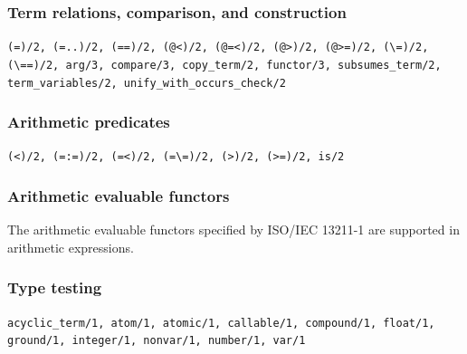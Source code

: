 \vspace{-4mm}
\subsubsection*{Term relations, comparison, and construction}\vspace{-2mm}
{\raggedright \texttt{(\allowbreak{}=)/\allowbreak{}2,\allowbreak{} (\allowbreak{}=..)/\allowbreak{}2,\allowbreak{} (\allowbreak{}==)/\allowbreak{}2,\allowbreak{} (\allowbreak{}@<)/\allowbreak{}2,\allowbreak{} (\allowbreak{}@=<)/\allowbreak{}2,\allowbreak{} (\allowbreak{}@>)/\allowbreak{}2,\allowbreak{} (\allowbreak{}@>=)/\allowbreak{}2,\allowbreak{} (\allowbreak{}\textbackslash=)/\allowbreak{}2,\allowbreak{} (\allowbreak{}\textbackslash==)/\allowbreak{}2,\allowbreak{} arg/\allowbreak{}3,\allowbreak{} compare/\allowbreak{}3,\allowbreak{} copy\_\allowbreak{}term/\allowbreak{}2,\allowbreak{} functor/\allowbreak{}3,\allowbreak{} subsumes\_\allowbreak{}term/\allowbreak{}2,\allowbreak{} term\_\allowbreak{}variables/\allowbreak{}2,\allowbreak{} unify\_\allowbreak{}with\_\allowbreak{}occurs\_\allowbreak{}check/\allowbreak{}2}\par}
\vspace{-4mm}
\subsubsection*{Arithmetic predicates}\vspace{-2mm}
{\raggedright \texttt{(\allowbreak{}<)/\allowbreak{}2,\allowbreak{} (\allowbreak{}=:=)/\allowbreak{}2,\allowbreak{} (\allowbreak{}=<)/\allowbreak{}2,\allowbreak{} (\allowbreak{}=\textbackslash=)/\allowbreak{}2,\allowbreak{} (\allowbreak{}>)/\allowbreak{}2,\allowbreak{} (\allowbreak{}>=)/\allowbreak{}2,\allowbreak{} is/\allowbreak{}2}\par}
\vspace{-4mm}
\subsubsection*{Arithmetic evaluable functors}\vspace{-2mm}
The arithmetic evaluable functors specified by ISO/IEC 13211-1 are supported
in arithmetic expressions.
\vspace{-4mm}
\subsubsection*{Type testing}\vspace{-2mm}
{\raggedright \texttt{acyclic\_\allowbreak{}term/\allowbreak{}1,\allowbreak{} atom/\allowbreak{}1,\allowbreak{} atomic/\allowbreak{}1,\allowbreak{} callable/\allowbreak{}1,\allowbreak{} compound/\allowbreak{}1,\allowbreak{} float/\allowbreak{}1,\allowbreak{} ground/\allowbreak{}1,\allowbreak{} integer/\allowbreak{}1,\allowbreak{} nonvar/\allowbreak{}1,\allowbreak{} number/\allowbreak{}1,\allowbreak{} var/\allowbreak{}1}\par}
\vspace{-4mm}
